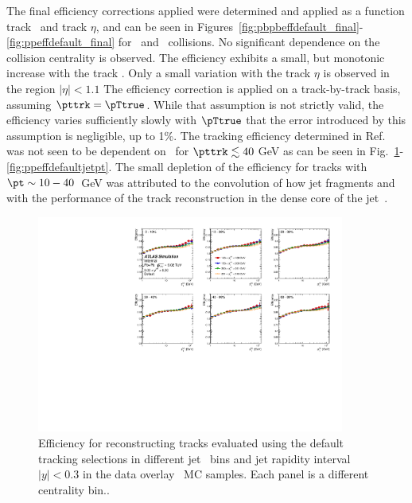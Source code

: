 The final efficiency corrections applied were determined and applied as a function track \pt\ and track $\eta$, and can be seen in Figures~\ref{fig:pbpbeffdefault_final}-\ref{fig:ppeffdefault_final} for \pp\ and \PbPb\ collisions. No significant dependence on the collision centrality is observed. The efficiency exhibits a small, but monotonic increase with the track \pt. Only a small variation with the track $\eta$ is observed in the region $|\eta|<1.1$ The efficiency correction is applied on a track-by-track basis, assuming $\pttrk = \pTtrue$. While that assumption is not strictly valid, the efficiency varies sufficiently slowly with $\pTtrue$ that the error introduced by this assumption is negligible, up to 1\%. The tracking efficiency determined in Ref.~\cite{PhysRevC.98.024908} was not seen to be dependent on \ptjet\ for $\pttrk \lesssim 40$ GeV as can be seen in Fig.~\ref{fig:pbpbeffdefaultjetpt_y0}-\ref{fig:ppeffdefaultjetpt}. The small depletion of the efficiency for tracks with $\pt \sim 10-40$~GeV was attributed to the convolution of how jet fragments and with the performance of the track reconstruction in the dense core of the jet~\cite{PhysRevC.98.024908}. 


\begin{figure}[ht]
   \centerline{
      \includegraphics[width=0.9\textwidth]{figures/main/corrections/eff_centrality_jetpt_jety0_ppTight.pdf}
   }
   \caption{Efficiency for reconstructing tracks evaluated using the default tracking selections in different jet \pT\ bins and jet rapidity interval $|y|<0.3$ in the data overlay \pbpb\ MC samples. Each panel is a different centrality bin..}
   \label{fig:pbpbeffdefaultjetpt_y0}
\end{figure}

